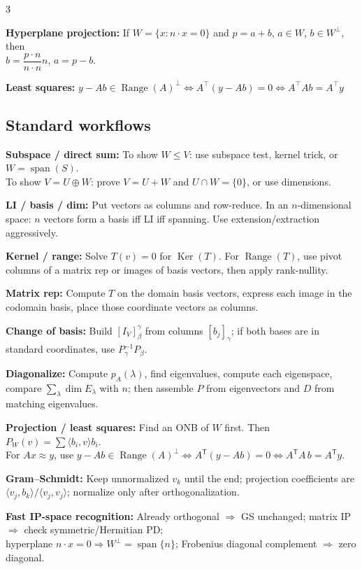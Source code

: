 \documentclass[10pt]{article}
\newcommand{\Ker}{\operatorname{Ker}}
\newcommand{\Range}{\operatorname{Range}}
\newcommand{\spann}{\operatorname{span}}
\newcommand{\ip}[2]{\langle #1,#2\rangle}
\newcommand{\T}{^{\mathsf T}}
\newenvironment{cheatitems}{\par\vspace{-1pt}}{\par\vspace{-1pt}}
\newcommand{\cheatrow}[2]{%
  \par\noindent\textbf{#1:}\nobreak\enspace #2\par
}
\begin{document}
\begin{multicols}{3}
\begin{cheatitems}
\cheatrow{Hyperplane projection}{
If $W=\{x:n\cdot x=0\}$ and $p=a+b$, $a\in W$, $b\in W^\perp$, then\\
$b=\dfrac{p\cdot n}{n\cdot n}n$, \qquad
$a=p-b$.
}

\cheatrow{Least squares}{
$y-Ab\in\Range(A)^\perp \iff A^\top(y-Ab)=0 \iff A^\top A b=A^\top y$
}

\end{cheatitems}

\subsection*{Standard workflows}
\begin{cheatitems}

\cheatrow{Subspace / direct sum}{
To show $W\le V$: use subspace test, kernel trick, or $W=\spann(S)$.\\
To show $V=U\oplus W$: prove $V=U+W$ and $U\cap W=\{0\}$, or use dimensions.
}

\cheatrow{LI / basis / dim}{
Put vectors as columns and row-reduce. In an $n$-dimensional space: 
$n$ vectors form a basis iff LI iff spanning. Use extension/extraction aggressively.
}

\cheatrow{Kernel / range}{
Solve $T(v)=0$ for $\Ker(T)$. For $\Range(T)$, use pivot columns of a matrix rep or images of basis vectors, then apply rank-nullity.
}

\cheatrow{Matrix rep}{
Compute $T$ on the domain basis vectors, express each image in the codomain basis, place those coordinate vectors as columns.
}

\cheatrow{Change of basis}{
Build $[I_V]^\gamma_\beta$ from columns $[b_j]_\gamma$;  
if both bases are in standard coordinates, use $P_\gamma^{-1}P_\beta$.
}

\cheatrow{Diagonalize}{
Compute $p_A(\lambda)$, find eigenvalues, compute each eigenspace, compare 
$\sum_\lambda \dim E_\lambda$ with $n$; then assemble $P$ from eigenvectors and $D$ from matching eigenvalues.
}

\cheatrow{Projection / least squares}{
Find an ONB of $W$ first. Then $P_W(v)=\sum \ip{b_i}{v}b_i$.\\
For $Ax\approx y$, use $y-Ab\in\Range(A)^\perp \iff A\T(y-Ab)=0 \iff A\T A\,b=A\T y$.
}

\cheatrow{Gram--Schmidt}{
Keep unnormalized $v_k$ until the end; projection coefficients are 
$\ip{v_j}{b_k}/\ip{v_j}{v_j}$; normalize only after orthogonalization.
}

\cheatrow{Fast IP-space recognition}{
Already orthogonal $\Rightarrow$ GS unchanged; 
matrix IP $\Rightarrow$ check symmetric/Hermitian PD;\\
hyperplane $n\cdot x=0\Rightarrow W^\perp=\spann\{n\}$; 
Frobenius diagonal complement $\Rightarrow$ zero diagonal.
}


\end{cheatitems}
\end{multicols}
\end{document}
